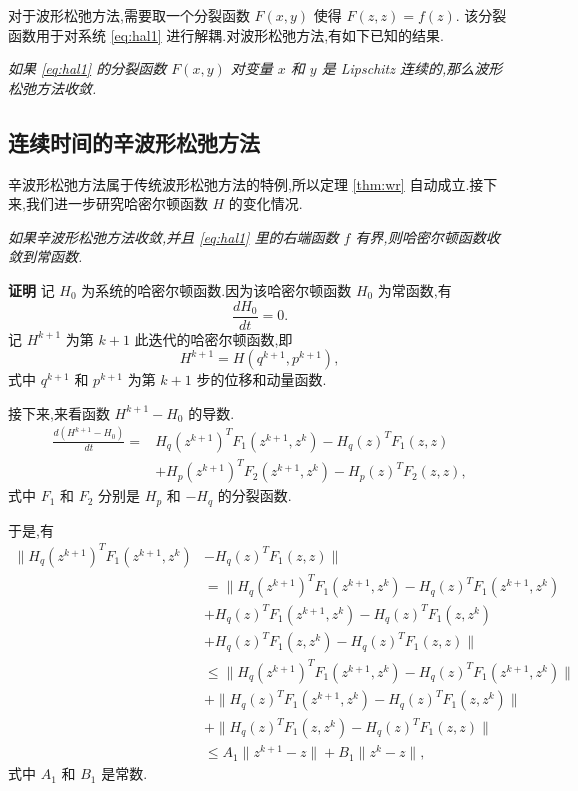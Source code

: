对于波形松弛方法,需要取一个分裂函数 $F(x,y)$ 使得 $F(z,z)=f(z)$. 该分裂函数用于对系统 \eqref{eq:hal1} 进行解耦.对波形松弛方法,有如下已知的结果.

\begin{theorem}\label{thm:wr}
	\emph{如果 \eqref{eq:hal1} 的分裂函数 $F(x,y)$ 对变量 $x$ 和 $y$ 是 Lipschitz 连续的,那么波形松弛方法收敛.}
\end{theorem}

\subsection{连续时间的辛波形松弛方法}
辛波形松弛方法属于传统波形松弛方法的特例,所以定理 \ref{thm:wr} 自动成立.接下来,我们进一步研究哈密尔顿函数 $H$ 的变化情况.

\begin{theorem}
\emph{如果辛波形松弛方法收敛,并且 \eqref{eq:hal1} 里的右端函数 $f$ 有界,则哈密尔顿函数收敛到常函数.}
\end{theorem}

{\textbf{证明}} 记 $H_0$ 为系统的哈密尔顿函数.因为该哈密尔顿函数 $H_0$ 为常函数,有
\begin{equation*}
\frac{dH_0}{dt}=0.
\end{equation*}
记 $H^{k+1}$ 为第 $k+1$ 此迭代的哈密尔顿函数,即
\begin{equation*}
H^{k+1}=H(q^{k+1},p^{k+1}),
\end{equation*}
式中 $q^{k+1}$ 和 $p^{k+1}$ 为第 $k+1$ 步的位移和动量函数.

接下来,来看函数 $H^{k+1}-H_0$ 的导数.
\begin{equation*}
\begin{aligned}
\frac{d(H^{k+1}-H_0)}{dt}=&H_q(z^{k+1})^TF_1(z^{k+1},z^{k})-H_q(z)^TF_1(z,z)\\
&+H_p(z^{k+1})^TF_2(z^{k+1},z^{k})-H_p(z)^TF_2(z,z),
\end{aligned}
\end{equation*}
式中 $F_1$ 和 $F_2$ 分别是 $H_p$ 和 $-H_q$ 的分裂函数.

于是,有
\begin{equation*}
\begin{aligned}
\|H_q(z^{k+1})^TF_1(z^{k+1},z^{k})&-H_q(z)^TF_1(z,z)\|\\
&=\|H_q(z^{k+1})^TF_1(z^{k+1},z^{k})-H_q(z)^TF_1(z^{k+1},z^{k})\\
&+H_q(z)^TF_1(z^{k+1},z^{k})-H_q(z)^TF_1(z,z^{k})\\
&+H_q(z)^TF_1(z,z^{k})-H_q(z)^TF_1(z,z)\|\\
&\le\|H_q(z^{k+1})^TF_1(z^{k+1},z^{k})-H_q(z)^TF_1(z^{k+1},z^{k})\|\\
&+\|H_q(z)^TF_1(z^{k+1},z^{k})-H_q(z)^TF_1(z,z^{k})\|\\
&+\|H_q(z)^TF_1(z,z^{k})-H_q(z)^TF_1(z,z)\|\\
&\le A_1\|z^{k+1}-z\|+B_1\|z^{k}-z\|,
\end{aligned}
\end{equation*}
式中 $A_1$ 和 $B_1$ 是常数.


